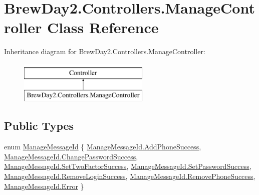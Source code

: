 \hypertarget{class_brew_day2_1_1_controllers_1_1_manage_controller}{}\section{Brew\+Day2.\+Controllers.\+Manage\+Controller Class Reference}
\label{class_brew_day2_1_1_controllers_1_1_manage_controller}
Inheritance diagram for Brew\+Day2.\+Controllers.\+Manage\+Controller\+:\begin{figure}[H]
\begin{center}
\leavevmode
\includegraphics[height=2.000000cm]{class_brew_day2_1_1_controllers_1_1_manage_controller}
\end{center}
\end{figure}
\subsection*{Public Types}
\begin{DoxyCompactItemize}
\item 
enum \mbox{\hyperlink{class_brew_day2_1_1_controllers_1_1_manage_controller_a418038dc90e9d94606f474b9c06fd8c8}{Manage\+Message\+Id}} \{ \newline
\mbox{\hyperlink{class_brew_day2_1_1_controllers_1_1_manage_controller_a418038dc90e9d94606f474b9c06fd8c8af08d36b2147213fadb3b223d149ac802}{Manage\+Message\+Id.\+Add\+Phone\+Success}}, 
\mbox{\hyperlink{class_brew_day2_1_1_controllers_1_1_manage_controller_a418038dc90e9d94606f474b9c06fd8c8a0053618c57496fec45c67daf91919394}{Manage\+Message\+Id.\+Change\+Password\+Success}}, 
\mbox{\hyperlink{class_brew_day2_1_1_controllers_1_1_manage_controller_a418038dc90e9d94606f474b9c06fd8c8af17987d9118fd576fed3cbec8d11bd8b}{Manage\+Message\+Id.\+Set\+Two\+Factor\+Success}}, 
\mbox{\hyperlink{class_brew_day2_1_1_controllers_1_1_manage_controller_a418038dc90e9d94606f474b9c06fd8c8af17ca72fcf8adaa46d5e87b12ec3a27d}{Manage\+Message\+Id.\+Set\+Password\+Success}}, 
\newline
\mbox{\hyperlink{class_brew_day2_1_1_controllers_1_1_manage_controller_a418038dc90e9d94606f474b9c06fd8c8a46e53931d0e837638a46368b2b04ba6a}{Manage\+Message\+Id.\+Remove\+Login\+Success}}, 
\mbox{\hyperlink{class_brew_day2_1_1_controllers_1_1_manage_controller_a418038dc90e9d94606f474b9c06fd8c8a70460d8db9c29752c1f591eb67a60fdc}{Manage\+Message\+Id.\+Remove\+Phone\+Success}}, 
\mbox{\hyperlink{class_brew_day2_1_1_controllers_1_1_manage_controller_a418038dc90e9d94606f474b9c06fd8c8a902b0d55fddef6f8d651fe1035b7d4bd}{Manage\+Message\+Id.\+Error}}
 \}
\end{DoxyCompactItemize}
